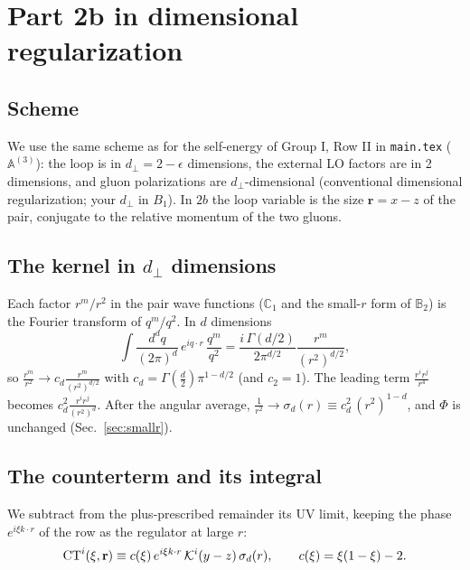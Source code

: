 \documentclass[10pt]{article}
\numberwithin{equation}{section}
\newcommand{\KK}{\mathcal K}
\newcommand{\Ph}{\hat\Phi}
\newcommand{\ve}{\epsilon}
\def\mf#1{\mathbb{#1}}
\begin{document}
\section{Part 2b in dimensional regularization}\label{sec:dimreg}
\subsection{Scheme}
We use the same scheme as for the self-energy of Group I, Row II in \texttt{main.tex} ($\mathbb A^{(3)}$): the loop is in $d_\perp=2-\ve$ dimensions, the external LO factors are in 2 dimensions, and gluon polarizations are $d_\perp$-dimensional (conventional dimensional regularization; your $d_\perp$ in $B_1$). In $2b$ the loop variable is the size $\mathbf r=x-z$ of the pair, conjugate to the relative momentum of the two gluons.

\subsection{The kernel in \texorpdfstring{$d_\perp$}{d} dimensions}
Each factor $r^m/r^2$ in the pair wave functions ($\mf C_1$ and the small-$r$ form of $\mf B_2$) is the Fourier transform of $q^m/q^2$. In $d$ dimensions
\begin{equation}
\int\frac{d^dq}{(2\pi)^d}\,e^{iq\cdot r}\,\frac{q^m}{q^2}=\frac{i\,\Gamma(d/2)}{2\pi^{d/2}}\frac{r^m}{(r^2)^{d/2}},
\end{equation}
so $\frac{r^m}{r^2}\to c_d\frac{r^m}{(r^2)^{d/2}}$ with $c_d=\Gamma(\frac d2)\pi^{1-d/2}$ (and $c_2=1$). The leading term $\frac{r^ir^j}{r^4}$ becomes $c_d^2\frac{r^ir^j}{(r^2)^d}$. After the angular average, $\frac{1}{r^2}\to\sigma_d(r)\equiv c_d^2\,(r^2)^{1-d}$, and $\Ph$ is unchanged (Sec.~\ref{sec:smallr}).

\subsection{The counterterm and its integral}
We subtract from the plus-prescribed remainder its UV limit, keeping the phase $e^{i\xi k\cdot r}$ of the row as the regulator at large $r$:
\begin{equation}
{\rm CT}^i(\xi,\mathbf r)\equiv c(\xi)\,e^{i\xi k\cdot r}\,\KK^i(y-z)\,\sigma_d(r),\qquad c(\xi)=\xi(1-\xi)-2 .
\end{equation}
\end{document}
